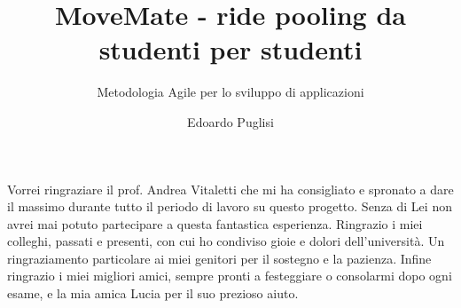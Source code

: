 \documentclass[Lau,noexaminfo,oneside,binding=0.6cm]{sapthesis}
\author{Edoardo Puglisi}
\title{MoveMate - ride pooling da studenti per studenti}
\subtitle{Metodologia Agile per lo sviluppo di applicazioni}
\begin{document}
\frontmatter
\maketitle
\dedication{Alla mia famiglia e alla Compagnia dell'Anello} 



\mainmatter

\begin{acknowledgments}
Vorrei ringraziare il prof. Andrea Vitaletti che mi ha consigliato e spronato a dare il massimo durante tutto il periodo di lavoro su questo progetto. Senza di Lei non avrei mai potuto partecipare a questa fantastica esperienza.
Ringrazio i miei colleghi, passati e presenti, con cui ho condiviso gioie e dolori dell'università.
Un ringraziamento particolare ai miei genitori per il sostegno e la pazienza.
Infine ringrazio i miei migliori amici, sempre pronti a festeggiare o consolarmi dopo ogni esame, e la mia amica Lucia per il suo prezioso aiuto.
\end{acknowledgments}

\tableofcontents








\end{document}
